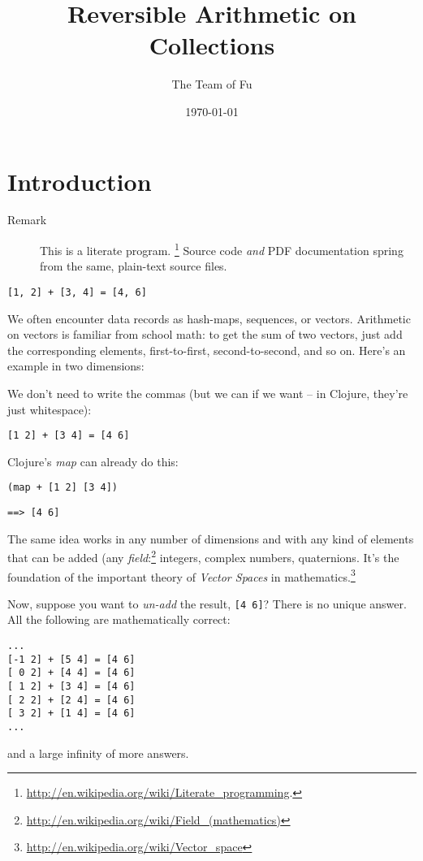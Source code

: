 \documentclass[11pt]{article}
\author{The Team of Fu}
\date{\today}
\title{Reversible Arithmetic on Collections}
\begin{document}
\maketitle
\tableofcontents


\section{Introduction}
\label{sec-1}
\begin{description}
\item[{Remark}] This is a literate program.
\footnote{\url{http://en.wikipedia.org/wiki/Literate_programming}.}
Source code \emph{and} PDF documentation spring
from the same, plain-text source files.
\end{description}

\begin{verbatim}
[1, 2] + [3, 4] = [4, 6]
\end{verbatim}
We often encounter data records as hash-maps, sequences, or vectors.
Arithmetic on vectors is familiar from school math: to get the sum of
two vectors, just add the corresponding elements, first-to-first,
second-to-second, and so on.  Here's an example in two dimensions:

We don't need to write the commas (but we can if we want -- in Clojure,
they're just whitespace):
\begin{verbatim}
[1 2] + [3 4] = [4 6]
\end{verbatim}

Clojure's \emph{map} can already do this:
\begin{verbatim}
(map + [1 2] [3 4])
\end{verbatim}
\begin{verbatim}
==> [4 6]
\end{verbatim}

The same idea works in any number of dimensions and with any kind of
elements that can be added (any
\emph{field}:\footnote{\url{http://en.wikipedia.org/wiki/Field_(mathematics)}} integers,
complex numbers, quaternions.  It's the foundation of the important
theory of \emph{Vector Spaces} in
mathematics.\footnote{\url{http://en.wikipedia.org/wiki/Vector_space}}

Now, suppose you want to \emph{un-add} the result, \verb|[4 6]|? There is no
unique answer.  All the following are mathematically correct:
\begin{verbatim}
...
[-1 2] + [5 4] = [4 6]
[ 0 2] + [4 4] = [4 6]
[ 1 2] + [3 4] = [4 6]
[ 2 2] + [2 4] = [4 6]
[ 3 2] + [1 4] = [4 6]
...
\end{verbatim}
and a large infinity of more answers.
\end{document}
